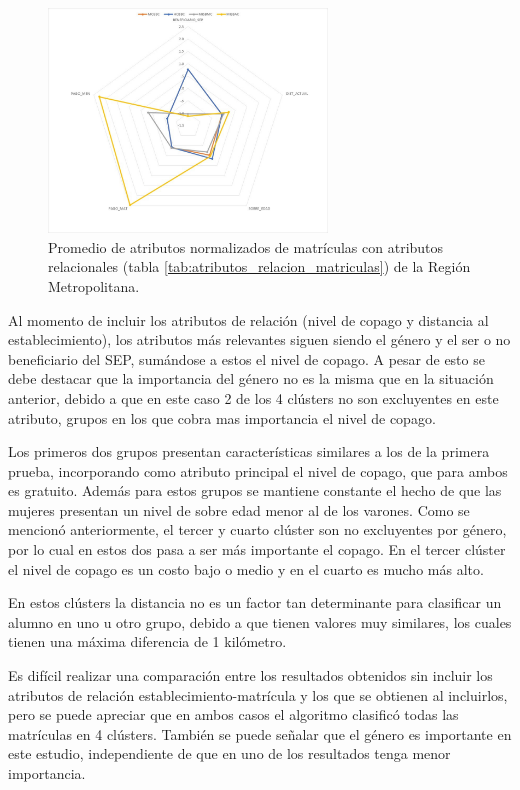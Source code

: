 \begin{figure}[H]
    \centering
    \includegraphics[width=0.66\textwidth]{images/radar_chart_matriculas_con.jpg}
    \caption{Promedio de atributos normalizados de matrículas con atributos relacionales (tabla \ref{tab:atributos_relacion_matriculas}) de la Región Metropolitana.}
    \label{fig:radar_mat_rel}
\end{figure}

Al momento de incluir los atributos de relación (nivel de copago y distancia al establecimiento), los atributos más relevantes siguen siendo el género y el ser o no beneficiario del SEP, sumándose a estos el nivel de copago. A pesar de esto se debe destacar que la importancia del género no es la misma que en la situación anterior, debido a que en este caso 2 de los 4 clústers no son excluyentes en este atributo, grupos en los que cobra mas importancia el nivel de copago.

Los primeros dos grupos presentan características similares a los de la primera prueba, incorporando como atributo principal el nivel de copago, que para ambos es gratuito. Además para estos grupos se mantiene constante el hecho de que las mujeres presentan un nivel de sobre edad menor al de los varones. Como se mencionó anteriormente, el tercer y cuarto clúster son no excluyentes por género, por lo cual en estos dos pasa a ser más importante el copago. En el tercer clúster el nivel de copago es un costo bajo o medio y en el cuarto es mucho más alto. 

En estos clústers la distancia no es un factor tan determinante para clasificar un alumno en uno u otro grupo, debido a que tienen valores muy similares, los cuales tienen una máxima diferencia de 1 kilómetro.

Es difícil realizar una comparación entre los resultados obtenidos sin incluir los atributos de relación establecimiento-matrícula y los que se obtienen al incluirlos, pero se puede apreciar que en ambos casos el algoritmo clasificó todas las matrículas en 4 clústers. También se puede señalar que el género es importante en este estudio, independiente de que en uno de los resultados tenga menor importancia.

